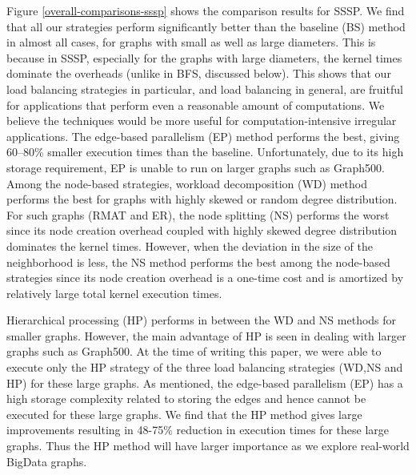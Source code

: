 Figure \ref{overall-comparisons-sssp} shows the comparison results for SSSP. We find that all our strategies perform significantly better than the baseline (BS) method in almost all cases, for graphs with small as well as large diameters. This is because in SSSP, especially for the graphs with large diameters, the kernel times dominate the overheads (unlike in BFS, discussed below).  This shows that our load balancing strategies in particular, and load balancing in general, are fruitful for applications that perform even a reasonable amount of computations. We believe the techniques would be more useful for computation-intensive irregular applications. The edge-based parallelism (EP) method performs the best, giving 60--80\% smaller execution times than the baseline. Unfortunately, due to its high storage requirement, EP is unable to run on larger graphs such as Graph500. Among the node-based strategies, workload decomposition (WD) method performs the best for graphs with highly skewed or random degree distribution. For such graphs (RMAT and ER), the node splitting (NS) performs the worst since its node creation overhead coupled with highly skewed degree distribution dominates the kernel times. However, when the deviation in the size of the neighborhood is less, the NS method performs the best among the node-based strategies since its node creation overhead is a one-time cost and is amortized by relatively large total kernel execution times.

Hierarchical processing (HP) performs in between the WD and NS methods for smaller graphs. However, the main advantage of HP is seen in dealing with larger graphs such as Graph500. At the time of writing this paper, we were able to execute only the HP strategy of the three load balancing strategies (WD,NS and HP) for these large graphs.
As mentioned, the edge-based parallelism (EP) has a high storage complexity related to storing the edges and hence cannot be executed for these large graphs.
We find that the HP method gives large improvements resulting in 48-75\% reduction in execution times for these large graphs. Thus the HP method will have larger importance as we explore real-world BigData graphs.


